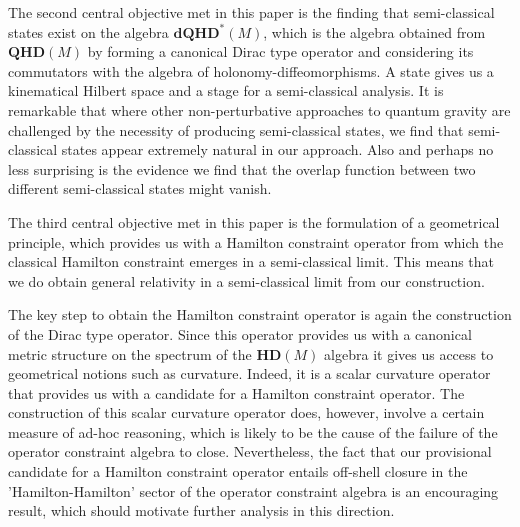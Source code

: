 \documentclass[12pt]{article}
\begin{document}

The second central objective met in this paper is the finding that semi-classical states exist on the algebra $\mathbf{dQHD}^*(M) $, which is the algebra obtained from $\mathbf{QHD}(M) $ by forming a canonical Dirac type operator and considering its commutators with the algebra of holonomy-diffeomorphisms. 
%
A state gives us a kinematical Hilbert space and a stage for a semi-classical analysis. It is remarkable that where other non-perturbative approaches to quantum gravity are challenged by the necessity of producing semi-classical states, we find that semi-classical states appear extremely natural in our approach. Also and perhaps no less surprising is the evidence we find that the overlap function between two different semi-classical states might vanish. %
%



The third central objective met in this paper is the formulation of a geometrical principle, which provides us with a Hamilton constraint operator from which the classical Hamilton constraint emerges in a semi-classical limit. This means that we do obtain general relativity in a semi-classical limit from our construction.%

The key step to obtain the Hamilton constraint operator is again the construction of the Dirac type operator. Since this operator provides us with a canonical metric structure on the spectrum of the $\mathbf{HD}(M) $ algebra it gives us access to geometrical notions such as curvature. Indeed, it is a scalar curvature operator that provides us with a candidate for a Hamilton constraint operator. The construction of this scalar curvature operator does, however, involve a certain measure of ad-hoc reasoning, which is likely to be the cause of the failure of the operator constraint algebra to close. Nevertheless, the fact that our provisional candidate for a Hamilton constraint operator entails off-shell closure in the 'Hamilton-Hamilton' sector of the operator constraint algebra is an encouraging result, which should motivate further analysis in this direction.
\end{document}
